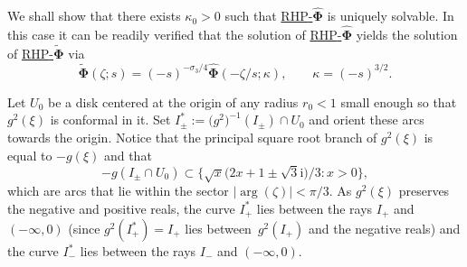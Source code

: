 \documentclass[pdftex]{sigma}
\numberwithin{equation}{section}
\renewcommand{\arg}{\operatorname{arg}}
\newcommand{\ic}{\mathrm{i}}
\newcommand{\rhwphi} {\textnormal{RHP}-${\widetilde{\boldsymbol \Phi}}$}
\newcommand{\rhhphi} {\textnormal{RHP}-${\widehat{\boldsymbol \Phi}}$}
\begin{document}
We shall show that there exists $ \kappa_0 >0 $ such that \hyperref[rhhphi]{\rhhphi} is uniquely solvable. In this case it can be readily verified that the solution of \hyperref[rhhphi]{\rhhphi} yields the solution of \hyperref[rhwphi]{\rhwphi} via
\[
\widetilde{\boldsymbol\Phi}(\zeta;s) = (-s)^{-\sigma_3/4}\widehat{\boldsymbol\Phi}(-\zeta/s;\kappa), \qquad \kappa = (-s)^{3/2}.
\]

Let $ U_0 $ be a disk centered at the origin of any radius $ r_0<1 $ small enough so that $ g^2(\xi) $ is conformal in it. Set $ I_\pm^* := \bigl(g^2\bigr)^{-1}(I_\pm)\cap U_0 $ and orient these arcs towards the origin. Notice that the principal square root branch of $ g^2(\xi) $ is equal to $ -g(\xi) $ and that
\[
-g(I_\pm\cap U_0) \subset \bigl\{ \sqrt x\bigl(2x+1 \pm \sqrt 3\ic\bigr)/3 : x>0\bigr\},
\]
which are arcs that lie within the sector $ |\arg(\zeta)|<\pi/3 $. As $ g^2(\xi) $ preserves the negative and positive reals, the curve $ I_+^* $ lies between the rays $ I_+ $ and $ (-\infty,0) $ (since $ g^2(I_+^*) = I_+ $ lies between~$ g^2(I_+) $ and the negative reals) and the curve $ I_-^* $ lies between the rays $ I_- $ and $ (-\infty,0) $.
\end{document}
